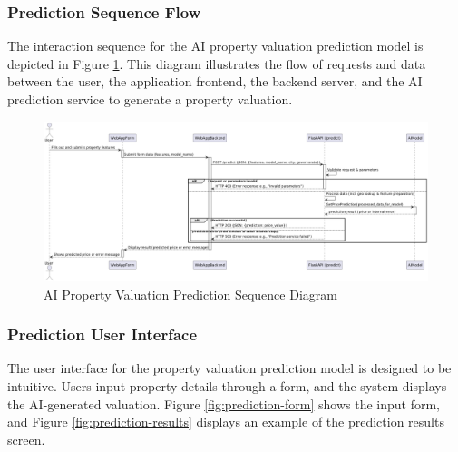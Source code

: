 \subsubsection{Prediction Sequence Flow}
The interaction sequence for the AI property valuation prediction model is depicted in Figure \ref{fig:ai-prediction-sequence}. This diagram illustrates the flow of requests and data between the user, the application frontend, the backend server, and the AI prediction service to generate a property valuation.

\begin{figure}[htbp]
    \centering
    \includegraphics[width=1\textwidth]{images/sequence_AI_prediction_model.png} %
    \caption{AI Property Valuation Prediction Sequence Diagram}
    \label{fig:ai-prediction-sequence}
\end{figure}


\subsubsection{Prediction User Interface}
The user interface for the property valuation prediction model is designed to be intuitive. Users input property details through a form, and the system displays the AI-generated valuation. Figure \ref{fig:prediction-form} shows the input form, and Figure \ref{fig:prediction-results} displays an example of the prediction results screen.

